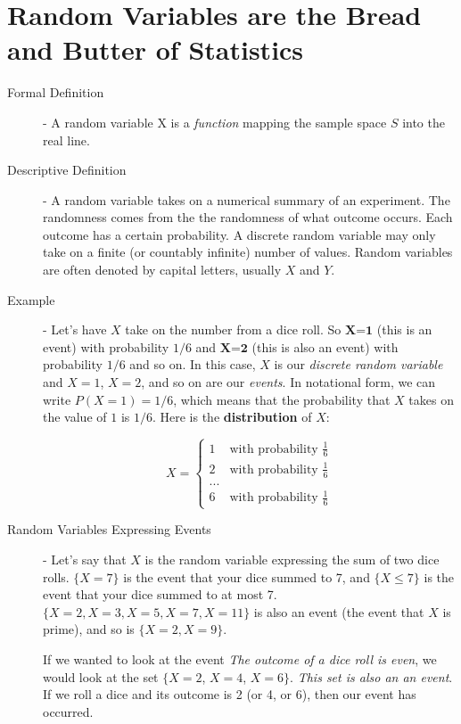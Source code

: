 \documentclass[11pt]{article}
\begin{document}
\section*{Random Variables are the Bread and Butter of Statistics}
\begin{description}
  \item[Formal Definition] - A random variable X is a \emph{function} mapping the sample space $S$ into the real line.
  \item[Descriptive Definition] - A random variable takes on a numerical summary of an experiment. The randomness comes from the the randomness of what outcome occurs. Each outcome has a certain probability. A discrete random variable may only take on a finite (or countably infinite) number of values. Random variables are often denoted by capital letters, usually $X$ and $Y$.
  \item[Example] - Let's have $X$ take on the number from a dice roll. So $\textbf{X=1}$ (this is an event) with probability $1/6$ and $\textbf{X=2}$ (this is also an event) with probability $1/6$ and so on. In this case, $X$ is our \emph{discrete random variable} and  $X=1$, $X=2$, and so on are our \emph{events}. In notational form, we can write $P(X=1) = 1/6$, which means that the probability that $X$ takes on the value of $1$ is $1/6$. Here is the \textbf{distribution} of $X$:

\[
X =
 \begin{cases}
   1 & \text{with probability }\frac{1}{6} \\
   2 & \text{with probability }\frac{1}{6} \\
... \\
   6 & \text{with probability }\frac{1}{6}
  \end{cases}
\]

  \item[Random Variables Expressing Events] - Let's say that $X$ is the random variable expressing the sum of two dice rolls. $\{X = 7\}$ is the event that your dice summed to 7, and $\{X \leq 7\}$ is the event that your dice summed to at most 7. $\{X = 2, X = 3, X = 5, X = 7, X = 11\}$ is also an event (the event that $X$ is prime), and so is $\{X = 2, X=9\}$.

If we wanted to look at the event \emph{The outcome of a dice roll is even}, we would look at the set $\{$$X=2$, $X=4$, $X=6$$\}$. \emph{This set is also an an event}. If we roll a dice and its outcome is 2 (or 4, or 6), then our event has occurred.


\end{description}
\end{document}
